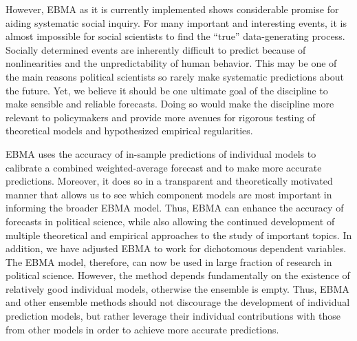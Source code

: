 
However, EBMA as it is currently implemented shows considerable
promise for aiding systematic social inquiry.  For many important and
interesting events, it is almost impossible for social scientists to
find the ``true'' data-generating process.  Socially determined events
are inherently difficult to predict because of nonlinearities and the
unpredictability of human behavior.  This may be one of the main
reasons political scientists so rarely make systematic predictions
about the future. Yet, we believe it should be one ultimate goal of
the discipline to make sensible and reliable forecasts.  Doing so
would make the discipline more relevant to policymakers and provide
more avenues for rigorous testing of theoretical models and
hypothesized empirical regularities.

EBMA uses the accuracy of in-sample predictions of individual models
to calibrate a combined weighted-average forecast and to make more
accurate predictions.  Moreover, it does so in a transparent and
theoretically motivated manner that allows us to see which component
models are most important in informing the broader EBMA model.  Thus,
EBMA can enhance the accuracy of forecasts in political science, while
also allowing the continued development of multiple theoretical and
empirical approaches to the study of important topics. In addition, we
have adjusted EBMA to work for dichotomous dependent variables.  The
EBMA model, therefore, can now be used in large fraction of research
in political science. However, the method depends fundamentally on the
existence of relatively good individual models, otherwise the ensemble
is empty. Thus, EBMA and other ensemble methods should not discourage
the development of individual prediction models, but rather leverage
their individual contributions with those from other models in order
to achieve more accurate predictions.

